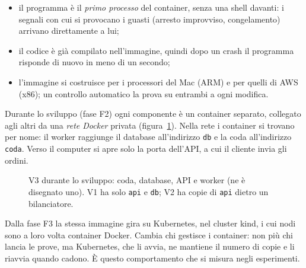 \begin{itemize}
  \item il programma è il \emph{primo processo} del container, senza una shell davanti: i segnali con cui si provocano i guasti (arresto improvviso, congelamento) arrivano direttamente a lui;
  \item il codice è già compilato nell'immagine, quindi dopo un crash il programma risponde di nuovo in meno di un secondo;
  \item l'immagine si costruisce per i processori del Mac (ARM) e per quelli di AWS (x86); un controllo automatico la prova su entrambi a ogni modifica.
\end{itemize}

Durante lo sviluppo (fase F2) ogni componente è un container separato, collegato agli altri da una \emph{rete Docker} privata (figura~\ref{fig:container}). Nella rete i container si trovano per nome: il worker raggiunge il database all'indirizzo \texttt{db} e la coda all'indirizzo \texttt{coda}. Verso il computer si apre solo la porta dell'API, a cui il cliente invia gli ordini.

\begin{figure}[H]
\centering
{}
\caption{V3 durante lo sviluppo: coda, database, API e  worker (ne è disegnato uno). V1 ha solo \texttt{api} e \texttt{db}; V2 ha  copie di \texttt{api} dietro un bilanciatore.}
\label{fig:container}
\end{figure}

Dalla fase F3 la stessa immagine gira su Kubernetes, nel cluster kind, i cui nodi sono a loro volta container Docker. Cambia chi gestisce i container: non più chi lancia le prove, ma Kubernetes, che li avvia, ne mantiene il numero di copie e li riavvia quando cadono. È questo comportamento che si misura negli esperimenti.
